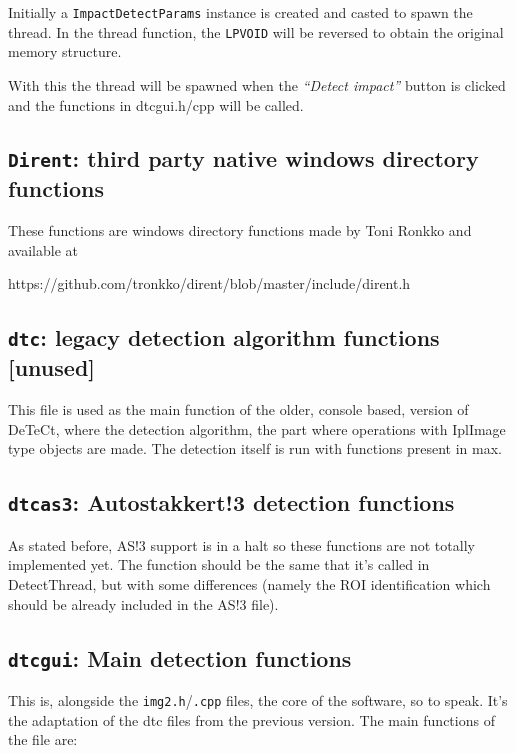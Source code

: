 \documentclass[a4paper,11pt]{memoir}
\begin{document}
Initially a \texttt{ImpactDetectParams} instance is created and casted to spawn the thread. In the
thread function, the \texttt{LPVOID} will be reversed to obtain the original memory structure.

With this the thread will be spawned when the \textit{“Detect impact”} button is clicked and the
functions in dtcgui.h/cpp will be called.

\subsection{\texttt{Dirent}: third party native windows directory functions}

These functions are windows directory functions made by Toni Ronkko and available at

https://github.com/tronkko/dirent/blob/master/include/dirent.h

\subsection{\texttt{dtc}: legacy detection algorithm functions [unused]}

This file is used as the main function of the older, console based, version of DeTeCt, where the detection algorithm, the part where operations with IplImage type objects are made. The detection itself is run with functions present in max.

\subsection{\texttt{dtcas3}: Autostakkert!3 detection functions}

As stated before, AS!3 support is in a halt so these functions are not totally implemented yet. The function should be the same that it’s called in DetectThread, but with some differences (namely the ROI identification which should be already included in the AS!3 file).

\subsection{\texttt{dtcgui}: Main detection functions}

This is, alongside the \texttt{img2.h}/\texttt{.cpp} files, the core of the software, so to speak. It’s the adaptation of the dtc files from the previous version. The main functions of the file are:
\end{document}
